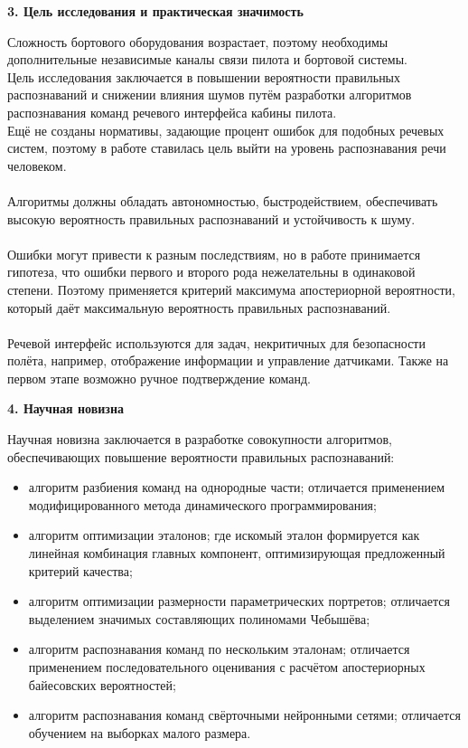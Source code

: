 \documentclass[a4paper, 12pt]{article}
\begin{document}
	\begin{center}
		\textbf{\large 3. Цель исследования и практическая значимость}
	\end{center}	
	\noindent
	Сложность бортового оборудования возрастает, поэтому необходимы дополнительные независимые каналы связи пилота и бортовой системы.
	\\
	Цель исследования заключается в повышении вероятности правильных распознаваний и снижении влияния шумов путём разработки алгоритмов распознавания команд речевого интерфейса кабины пилота.
	\\
	Ещё не созданы нормативы, задающие процент ошибок для подобных речевых систем, поэтому в работе ставилась цель выйти на уровень распознавания речи человеком.
	\\\\
	Алгоритмы должны обладать автономностью, быстродействием, обеспечивать высокую вероятность правильных распознаваний и устойчивость к шуму.
	\\\\
	Ошибки могут привести к разным последствиям, но в работе принимается гипотеза, что ошибки первого и второго рода нежелательны в одинаковой степени. Поэтому применяется критерий максимума апостериорной вероятности, который даёт максимальную вероятность правильных распознаваний.
	\\\\
	Речевой интерфейс используются для задач, некритичных для безопасности полёта, например, отображение информации и управление датчиками. Также на первом этапе возможно ручное подтверждение команд.
	
	
	
	\begin{center}
		\textbf{\large 4. Научная новизна}
	\end{center}	
	\noindent
	Научная новизна заключается в разработке совокупности алгоритмов, обеспечивающих повышение вероятности правильных распознаваний:
	\begin{itemize}
	\item алгоритм разбиения команд на однородные части; отличается применением модифицированного метода динамического программирования;
	\item алгоритм оптимизации эталонов; где искомый эталон формируется как линейная комбинация главных компонент, оптимизирующая предложенный критерий качества;
	\item алгоритм оптимизации размерности параметрических портретов; отличается выделением значимых составляющих полиномами Чебышёва;
	\item алгоритм распознавания команд по нескольким эталонам; отличается применением последовательного оценивания с расчётом апостериорных байесовских вероятностей;
	\item алгоритм распознавания команд свёрточными нейронными сетями; отличается обучением на выборках малого размера.
	\end{itemize}
	
\end{document}
